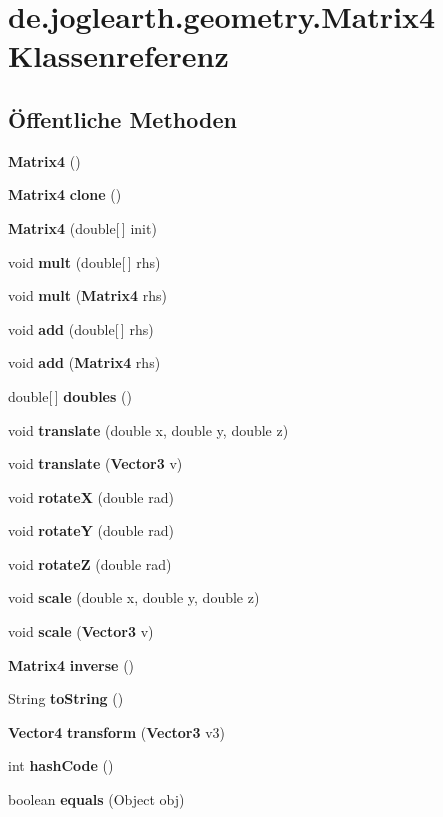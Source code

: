 \section{de.\-joglearth.\-geometry.\-Matrix4 \-Klassenreferenz}
\label{classde_1_1joglearth_1_1geometry_1_1_matrix4}
\subsection*{Öffentliche \-Methoden}
\begin{DoxyCompactItemize}
\item 
{\bf \-Matrix4} ()
\item 
{\bf \-Matrix4} {\bf clone} ()
\item 
{\bf \-Matrix4} (double[$\,$] init)
\item 
void {\bf mult} (double[$\,$] rhs)
\item 
void {\bf mult} ({\bf \-Matrix4} rhs)
\item 
void {\bf add} (double[$\,$] rhs)
\item 
void {\bf add} ({\bf \-Matrix4} rhs)
\item 
double[$\,$] {\bf doubles} ()
\item 
void {\bf translate} (double x, double y, double z)
\item 
void {\bf translate} ({\bf \-Vector3} v)
\item 
void {\bf rotate\-X} (double rad)
\item 
void {\bf rotate\-Y} (double rad)
\item 
void {\bf rotate\-Z} (double rad)
\item 
void {\bf scale} (double x, double y, double z)
\item 
void {\bf scale} ({\bf \-Vector3} v)
\item 
{\bf \-Matrix4} {\bf inverse} ()
\item 
\-String {\bf to\-String} ()
\item 
{\bf \-Vector4} {\bf transform} ({\bf \-Vector3} v3)
\item 
int {\bfseries hash\-Code} ()\label{classde_1_1joglearth_1_1geometry_1_1_matrix4_a7299aaf8de4c8734194fe0573c5976d2}

\item 
boolean {\bfseries equals} (\-Object obj)\label{classde_1_1joglearth_1_1geometry_1_1_matrix4_a607b1abe61ca18c63b9a794fb95f1207}

\end{DoxyCompactItemize}


